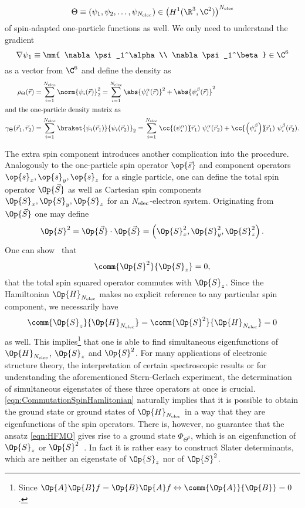 \begin{rem}
	\[ \Theta \equiv \left(\psi_1, \psi_2, \ldots, \psi_{\Nelec}\right)
		\in \left(H^1(\R^3, \C^2)\right)^{\Nelec} \]
	of spin-adapted one-particle functions as well.
	We only need to understand the gradient
	\[ \nabla \psi_1 \equiv \mm{ \nabla \psi_1^\alpha \\ \nabla \psi_1^\beta } \in \C^6 \]
	as a vector from $\C^6$
	and define the density as
	\begin{align}
		\rho_\Theta(\vec{r}) &= \sum_{i=1}^{\Nelec} \norm{\psi_i(\vec{r})}_2^2
		= \sum_{i=1}^{\Nelec} \abs{\psi_i^\alpha(\vec{r})}^2 + \abs{\psi_i^\beta(\vec{r})}^2 \\
	\intertext{and the one-particle density matrix as}
		\gamma_\Theta(\vec{r}_1,\vec{r}_2)
		&= \sum_{i=1}^{\Nelec} \braket{\psi_i(\vec{r}_1)}{\psi_i(\vec{r}_2)}_2
		= \sum_{i=1}^{\Nelec} \cc{\left(\psi_i^\alpha\right)}\!\!(\vec{r}_1)\  \psi_i^\alpha(\vec{r}_2)
			+ \cc{\left(\psi_i^\beta\right)}\!\!(\vec{r}_1)\  \psi_i^\beta(\vec{r}_2).
	\end{align}

	The extra spin component introduces another complication
	into the \HF procedure.
	Analogously to the one-particle spin operator $\op{\vec{s}}$
	and component operators $\op{s}_x, \op{s}_y, \op{s}_z$
	for a single particle,
	one can define the total spin operator $\Op{\vec{S}}$
	as well as Cartesian spin components $\Op{S}_x, \Op{S}_y, \Op{S}_z$
	for an $N_\text{elec}$-electron system.
	Originating from $\Op{\vec{S}}$ one may define
	\[ \Op{S}^2 = \Op{\vec{S}} \cdot \Op{\vec{S}} = \left(\Op{S}^2_x, \Op{S}^2_y, \Op{S}^2_z\right). \]
	One can show~\cite{Shankar1994} that
	\[ \comm{\Op{S}^2}{\Op{S}_z} = 0, \]
	\ie that the total spin squared operator commutes with $\Op{S}_z$.
	Since the Hamiltonian $\Op{H}_{\Nelec}$ makes no explicit reference
	to any particular spin component,
	we necessarily have
	\begin{equation}
		\comm{\Op{S}_z}{\Op{H}_{\Nelec}} = \comm{\Op{S}^2}{\Op{H}_{\Nelec}} = 0
		\label{eqn:CommutationSpinHamlitonian}
	\end{equation}
	as well.
	This implies\footnote{%
		Since $\Op{A}\Op{B} f = \Op{B}\Op{A} f \Leftrightarrow \comm{\Op{A}}{\Op{B}} = 0$.%
	}
	that one is able to find simultaneous eigenfunctions of $\Op{H}_{\Nelec}$,
	$\Op{S}_z$ and $\Op{S}^2$.
	For many applications of electronic structure theory,
	\eg the interpretation of certain spectroscopic results
	or for understanding the aforementioned Stern-Gerlach experiment,
	the determination of simultaneous eigenstates of these three operators at once
	is crucial.
	\eqref{eqn:CommutationSpinHamlitonian}
	naturally implies that it is possible to obtain the ground state
	or ground states of $\Op{H}_{\Nelec}$
	in a way that they are eigenfunctions of the spin operators.
	There is, however, no guarantee that the \HF ansatz
	\eqref{eqn:HFMO} gives rise to a \HF ground state $\Phi_{\Theta^0}$,
	which is an eigenfunction of $\Op{S}_z$ or $\Op{S}^2$~\cite{Fukutome1981,McWeeny1985}.
	In fact it is rather easy to construct Slater determinants,
	which are neither an eigenstate of $\Op{S}_z$ nor of $\Op{S}^2$.


\end{rem}
